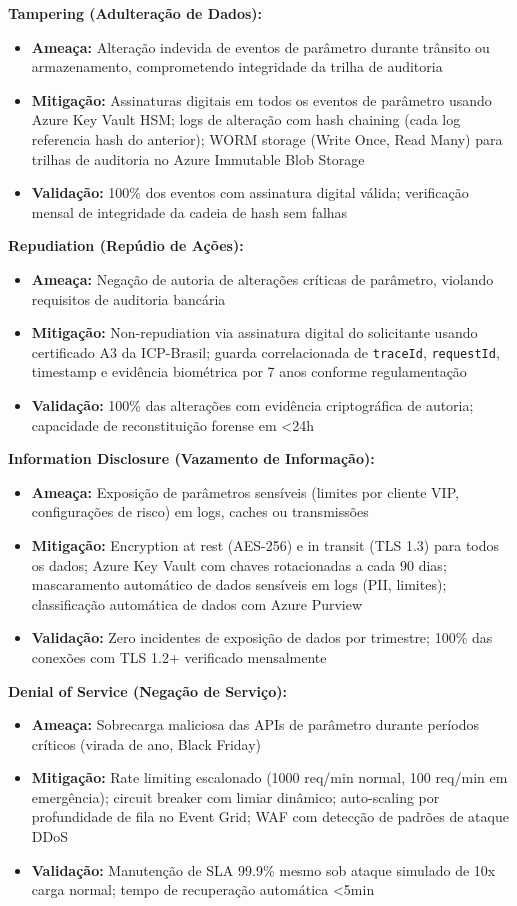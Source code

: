 \textbf{Tampering (Adulteração de Dados):}
\begin{itemize}
\item \textbf{Ameaça:} Alteração indevida de eventos de parâmetro durante trânsito ou armazenamento, comprometendo integridade da trilha de auditoria
\item \textbf{Mitigação:} Assinaturas digitais em todos os eventos de parâmetro usando Azure Key Vault HSM; logs de alteração com hash chaining (cada log referencia hash do anterior); WORM storage (Write Once, Read Many) para trilhas de auditoria no Azure Immutable Blob Storage
\item \textbf{Validação:} 100\% dos eventos com assinatura digital válida; verificação mensal de integridade da cadeia de hash sem falhas
\end{itemize}

\textbf{Repudiation (Repúdio de Ações):}
\begin{itemize}
\item \textbf{Ameaça:} Negação de autoria de alterações críticas de parâmetro, violando requisitos de auditoria bancária
\item \textbf{Mitigação:} Non-repudiation via assinatura digital do solicitante usando certificado A3 da ICP-Brasil; guarda correlacionada de \texttt{traceId}, \texttt{requestId}, timestamp e evidência biométrica por 7 anos conforme regulamentação
\item \textbf{Validação:} 100\% das alterações com evidência criptográfica de autoria; capacidade de reconstituição forense em <24h
\end{itemize}

\textbf{Information Disclosure (Vazamento de Informação):}
\begin{itemize}
\item \textbf{Ameaça:} Exposição de parâmetros sensíveis (limites por cliente VIP, configurações de risco) em logs, caches ou transmissões
\item \textbf{Mitigação:} Encryption at rest (AES-256) e in transit (TLS 1.3) para todos os dados; Azure Key Vault com chaves rotacionadas a cada 90 dias; mascaramento automático de dados sensíveis em logs (PII, limites); classificação automática de dados com Azure Purview
\item \textbf{Validação:} Zero incidentes de exposição de dados por trimestre; 100\% das conexões com TLS 1.2+ verificado mensalmente
\end{itemize}

\textbf{Denial of Service (Negação de Serviço):}
\begin{itemize}
\item \textbf{Ameaça:} Sobrecarga maliciosa das APIs de parâmetro durante períodos críticos (virada de ano, Black Friday)
\item \textbf{Mitigação:} Rate limiting escalonado (1000 req/min normal, 100 req/min em emergência); circuit breaker com limiar dinâmico; auto-scaling por profundidade de fila no Event Grid; WAF com detecção de padrões de ataque DDoS
\item \textbf{Validação:} Manutenção de SLA 99.9\% mesmo sob ataque simulado de 10x carga normal; tempo de recuperação automática <5min
\end{itemize}

